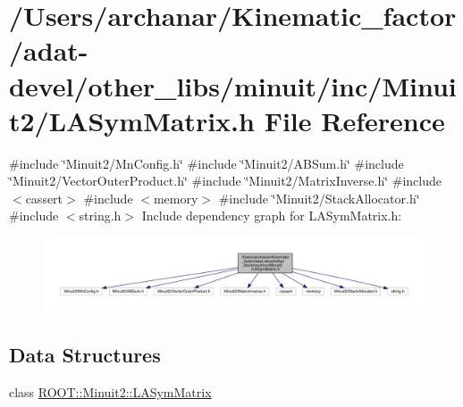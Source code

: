 \hypertarget{adat-devel_2other__libs_2minuit_2inc_2Minuit2_2LASymMatrix_8h}{}\section{/\+Users/archanar/\+Kinematic\+\_\+factor/adat-\/devel/other\+\_\+libs/minuit/inc/\+Minuit2/\+L\+A\+Sym\+Matrix.h File Reference}
\label{adat-devel_2other__libs_2minuit_2inc_2Minuit2_2LASymMatrix_8h}
{\ttfamily \#include \char`\"{}Minuit2/\+Mn\+Config.\+h\char`\"{}}\newline
{\ttfamily \#include \char`\"{}Minuit2/\+A\+B\+Sum.\+h\char`\"{}}\newline
{\ttfamily \#include \char`\"{}Minuit2/\+Vector\+Outer\+Product.\+h\char`\"{}}\newline
{\ttfamily \#include \char`\"{}Minuit2/\+Matrix\+Inverse.\+h\char`\"{}}\newline
{\ttfamily \#include $<$cassert$>$}\newline
{\ttfamily \#include $<$memory$>$}\newline
{\ttfamily \#include \char`\"{}Minuit2/\+Stack\+Allocator.\+h\char`\"{}}\newline
{\ttfamily \#include $<$string.\+h$>$}\newline
Include dependency graph for L\+A\+Sym\+Matrix.\+h\+:
\nopagebreak
\begin{figure}[H]
\begin{center}
\leavevmode
\includegraphics[width=350pt]{dc/dd8/adat-devel_2other__libs_2minuit_2inc_2Minuit2_2LASymMatrix_8h__incl}
\end{center}
\end{figure}
\subsection*{Data Structures}
\begin{DoxyCompactItemize}
\item 
class \mbox{\hyperlink{classROOT_1_1Minuit2_1_1LASymMatrix}{R\+O\+O\+T\+::\+Minuit2\+::\+L\+A\+Sym\+Matrix}}
\end{DoxyCompactItemize}

